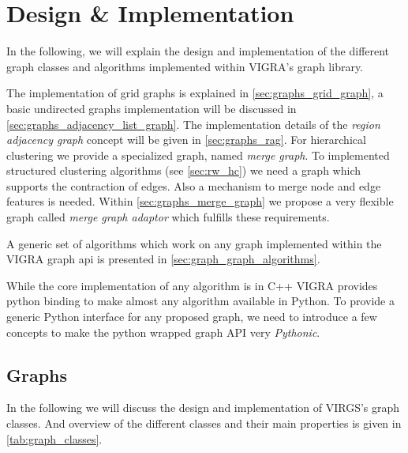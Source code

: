 

\section{Design \& Implementation}\label{sec:vigra_graph_lib_impl}


In the following, we will explain the design and 
implementation of the different graph classes and algorithms
implemented within VIGRA's graph library.


The implementation of grid graphs is explained in \cref{sec:graphs_grid_graph}, 
a basic undirected graphs implementation will be discussed in \cref{sec:graphs_adjacency_list_graph}.
The implementation details of the \emph{region adjacency graph} concept will 
be given in  \cref{sec:graphs_rag}.
For hierarchical clustering we provide a specialized graph, named \emph{merge graph}.
To implemented structured clustering algorithms (see \cref{sec:rw_hc}) we
need a graph which supports the contraction of edges.
Also a mechanism to merge node and edge features is needed.
Within \cref{sec:graphs_merge_graph} we propose  a very flexible graph 
called \emph{merge graph adaptor} which fulfills these requirements.


A generic set of algorithms which work on any graph
implemented within the VIGRA graph api is presented 
in \cref{sec:graph_graph_algorithms}.

While the core implementation of any algorithm is in C++
VIGRA provides python binding to make almost
any algorithm available in Python.
To provide a generic Python interface for any proposed
graph, we need to introduce a few concepts 
to make the python wrapped graph API very \emph{Pythonic}.






\subsection{Graphs} \label{sec:impl_graphs}

In the following we will discuss the design and implementation
of VIRGS's graph classes.
And overview of the different classes and their main properties
is given in \cref{tab:graph_classes}.

